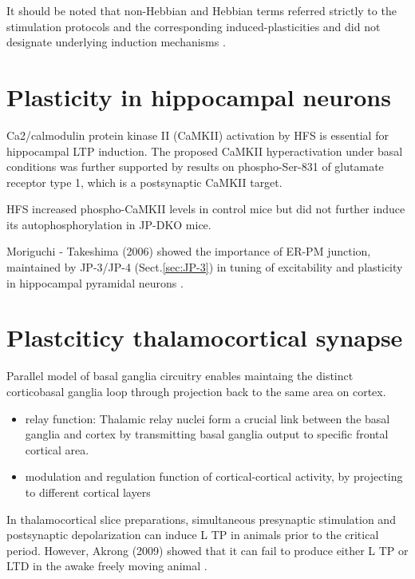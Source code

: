 It should be noted that non-Hebbian and Hebbian terms referred strictly to the
stimulation protocols and the corresponding induced-plasticities and did not
designate underlying induction mechanisms \citep{fino2005, fino2010}.

\section{Plasticity in hippocampal neurons}
\label{sec:hippocampus-synaptic-plasticity}

Ca2/calmodulin protein kinase II (CaMKII) activation by HFS is essential for
hippocampal LTP induction.
The proposed CaMKII hyperactivation under basal conditions was further supported
by results on phospho-Ser-831 of glutamate receptor type 1, which is a
postsynaptic CaMKII target.

HFS increased phospho-CaMKII levels in control mice but did not further induce its
autophosphorylation in JP-DKO mice.

Moriguchi - Takeshima (2006) showed the importance of ER-PM junction, maintained
by JP-3/JP-4 (Sect.\ref{sec:JP-3}) in tuning of excitability and plasticity
in hippocampal pyramidal neurons \citep{moriguchi2006}.


\section{Plastciticy thalamocortical synapse}
\label{sec:cortex-synaptic-plasticity}

Parallel model of basal ganglia circuitry enables maintaing the distinct
corticobasal ganglia loop through projection back to the same area on cortex.
\begin{itemize}
  \item relay function: Thalamic relay nuclei form a crucial link between the basal ganglia and cortex
by transmitting basal ganglia output to specific frontal cortical area.

  \item modulation and regulation function of cortical-cortical activity, by
  projecting to different cortical layers
\end{itemize}

In thalamocortical slice preparations, simultaneous presynaptic stimulation and
postsynaptic depolarization can induce L TP in animals prior to the critical
period. However, Akrong (2009) showed that it can fail to produce either L TP or
LTD in the awake freely moving animal \citep{akrong2009}.



